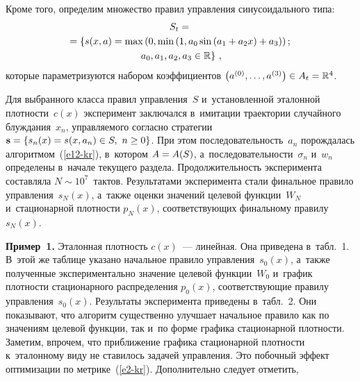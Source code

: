 \begin{multicols}{2}
  Кроме того, определим множество правил управ\-ле\-ния синусоидального 
типа:
  \begin{multline*}
  S_t={}\\
  \hspace*{-1.35pt}{}=\left\{ s(x,a)=\max \left( 0,\min \left( 1, a_0 \sin\left( 
a_1+a_2x\right)+a_3\right)\right);\right.\\
 \left.a_0, a_1, a_2, a_3 \in \mathbb{R}\right\}\,,
\end{multline*}
которые параметризуются набором коэффициентов $\left( a^{(0)}, \ldots , 
a^{(3)}\right) \hm\in A_t\hm= \mathbb{R}^4$.
  
  Для выбранного класса правил управ\-ле\-ния~$S$ и~установленной 
эталонной плот\-ности~$c(x)$ эксперимент заключался в~имитации траектории 
случайного блуж\-да\-ния~$x_n$, управ\-ля\-емо\-го согласно стратегии $\mathbf{s}=\{ 
s_n(x)=s(x, a_n)\hm\in S,\ n\hm\geq 0\}$. При этом последо\-ва\-тель\-ность~$a_n$ 
порождалась алгоритмом~(\ref{e12-kr}), в~котором $A\hm= A(S)$, 
а~последовательности~$\sigma_n$ и~$w_n$ определены в~начале текущего 
раздела. Продолжительность эксперимента составляла $N\sim 10^7$~тактов. 
Результатами эксперимента стали финальное правило управ\-ле\-ния~$s_N(x)$, 
а~так\-же оценки значений целевой функции~$W_N$ и~стационарной 
плотности $p_N(x)$, соответствующих финальному правилу~$s_N(x)$.
  
  \smallskip
  
  \noindent
  \textbf{Пример~1.} Эталонная плот\-ность $c(x)$~--- линейная. Она 
приведена в~табл.~1. В~этой же таб\-ли\-це указано начальное правило 
управления~$s_0(x)$, а~так\-же полученные экспериментально значение 
целевой функции~$W_0$ и~график плот\-ности стационарного распределения 
$p_0(x)$, соответствующие правилу управ\-ле\-ния~$s_0(x)$. Результаты 
эксперимента приведены в~табл.~2. Они показывают, что алгоритм 
существенно улучшает начальное правило как по значениям целевой 
функции, так и~по форме графика стационарной плот\-ности. Заметим, 
впрочем, что при\-бли\-же\-ние графика стационарной
 плотности к~эталонному 
виду не ставилось задачей управ\-ле\-ния. Это побочный эффект оптимизации 
по мет\-ри\-ке~(\ref{e2-kr}). Дополнительно следует отметить,\linebreak\vspace*{-12pt}

\pagebreak

\end{multicols}

